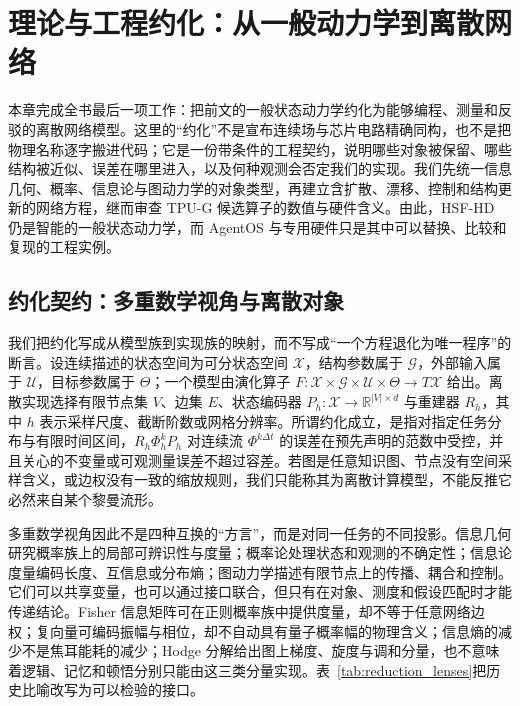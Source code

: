 \chapter{理论与工程约化：从一般动力学到离散网络}
\label{sec:section_5204}

本章完成全书最后一项工作：把前文的一般状态动力学约化为能够编程、测量和反驳的离散网络模型。这里的“约化”不是宣布连续场与芯片电路精确同构，也不是把物理名称逐字搬进代码；它是一份带条件的工程契约，说明哪些对象被保留、哪些结构被近似、误差在哪里进入，以及何种观测会否定我们的实现。我们先统一信息几何、概率、信息论与图动力学的对象类型，再建立含扩散、漂移、控制和结构更新的网络方程，继而审查 TPU-G 候选算子的数值与硬件含义。由此，HSF-HD 仍是智能的一般状态动力学，而 AgentOS 与专用硬件只是其中可以替换、比较和复现的工程实例。

\section{约化契约：多重数学视角与离散对象}

我们把约化写成从模型族到实现族的映射，而不写成“一个方程退化为唯一程序”的断言。设连续描述的状态空间为可分状态空间 $\mathcal X$，结构参数属于 $\mathcal G$，外部输入属于 $\mathcal U$，目标参数属于 $\Theta$；一个模型由演化算子 $F:\mathcal X\times\mathcal G\times\mathcal U\times\Theta\to T\mathcal X$ 给出。离散实现选择有限节点集 $V$、边集 $E$、状态编码器 $P_h:\mathcal X\to\mathbb R^{|V|\times d}$ 与重建器 $R_h$，其中 $h$ 表示采样尺度、截断阶数或网格分辨率。所谓约化成立，是指对指定任务分布与有限时间区间，$R_h\Phi_h^kP_h$ 对连续流 $\Phi^{k\Delta t}$ 的误差在预先声明的范数中受控，并且关心的不变量或可观测量误差不超过容差。若图是任意知识图、节点没有空间采样含义，或边权没有一致的缩放规则，我们只能称其为离散计算模型，不能反推它必然来自某个黎曼流形。

多重数学视角因此不是四种互换的“方言”，而是对同一任务的不同投影。信息几何研究概率族上的局部可辨识性与度量；概率论处理状态和观测的不确定性；信息论度量编码长度、互信息或分布熵；图动力学描述有限节点上的传播、耦合和控制。它们可以共享变量，也可以通过接口联合，但只有在对象、测度和假设匹配时才能传递结论。Fisher 信息矩阵可在正则概率族中提供度量，却不等于任意网络边权；复向量可编码振幅与相位，却不自动具有量子概率幅的物理含义；信息熵的减少不是焦耳能耗的减少；Hodge 分解给出图上梯度、旋度与调和分量，也不意味着逻辑、记忆和顿悟分别只能由这三类分量实现。表~\ref{tab:reduction_lenses}把历史比喻改写为可以检验的接口。


